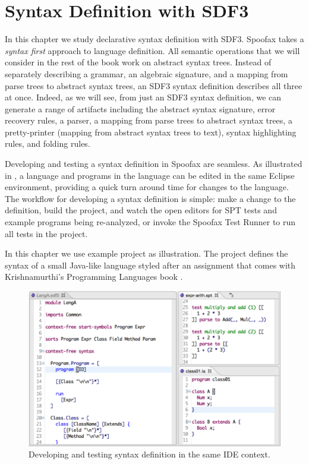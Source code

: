 \chapter{Syntax Definition with SDF3}

In this chapter we study declarative syntax definition with SDF3.
Spoofax takes a \emph{syntax first} approach to language definition.
All semantic operations that we will consider in the rest of the book work on
abstract syntax trees.
Instead of separately describing a grammar, an algebraic signature, and a
mapping from parse trees to abstract syntax trees, an SDF3 syntax definition
describes all three at once. 
Indeed, as we will see, from just an SDF3 syntax definition, we can generate a
range of artifacts including the abstract syntax signature, error recovery
rules, a parser, a mapping from parse trees to abstract syntax trees, a
pretty-printer (mapping from abstract syntax trees to text), syntax
highlighting rules, and folding rules.

Developing and testing a syntax definition in Spoofax are seamless. As
illustrated in , a language and programs in the language can
be edited in the same Eclipse environment, providing a quick turn around time
for changes to the language. The workflow for developing a syntax definition is
simple: make a change to the definition, build the project, and watch the
open editors for SPT tests and example programs being re-analyzed, or invoke
the Spoofax Test Runner to run all tests in the project.

In this chapter we use example project  as
illustration. The project defines the syntax of a small Java-like language
styled after an assignment that comes with
Krishnamurthi's Programming Languages book \cite{Krishnamurthi2014}.

\begin{figure}[t]
\includegraphics[width=\hsize]{syntax/syntax-dev.pdf}
\caption{Developing and testing syntax definition in the same IDE context.}
\end{figure}


